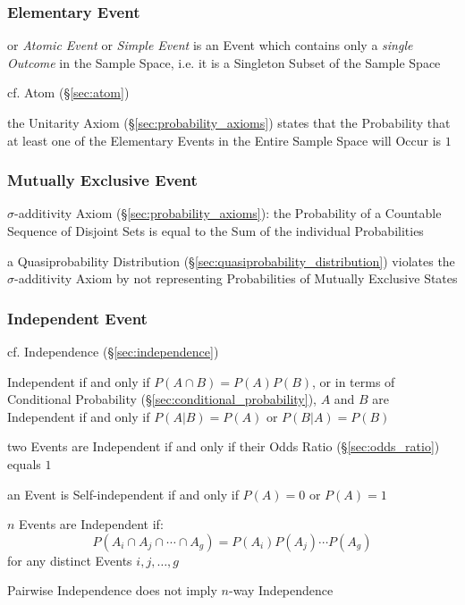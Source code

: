 \subsubsection{Elementary Event}\label{sec:elementary_event}

or \emph{Atomic Event} or \emph{Simple Event} is an Event which contains only a
\emph{single Outcome} in the Sample Space, i.e. it is a Singleton Subset of the
Sample Space

cf. Atom (\S\ref{sec:atom})

the Unitarity Axiom (\S\ref{sec:probability_axioms}) states that the
Probability that at least one of the Elementary Events in the Entire Sample
Space will Occur is $1$



\subsubsection{Mutually Exclusive Event}\label{sec:mutually_exclusive}

$\sigma$-additivity Axiom (\S\ref{sec:probability_axioms}): the Probability of
a Countable Sequence of Disjoint Sets is equal to the Sum of the individual
Probabilities

a Quasiprobability Distribution (\S\ref{sec:quasiprobability_distribution})
violates the $\sigma$-additivity Axiom by not representing Probabilities of
Mutually Exclusive States



\subsubsection{Independent Event}\label{sec:independent_event}

\fist cf. Independence (\S\ref{sec:independence})

Independent if and only if $P(A \cap B) = P(A) P(B)$, or in terms of Conditional
Probability (\S\ref{sec:conditional_probability}), $A$ and $B$ are Independent
if and only if $P(A|B) = P(A)$ or $P(B|A) = P(B)$

\fist two Events are Independent if and only if their Odds Ratio
(\S\ref{sec:odds_ratio}) equals $1$

an Event is Self-independent if and only if $P(A) = 0$ or $P(A) = 1$

$n$ Events are Independent if:
\[
  P(A_i \cap A_j \cap \cdots \cap A_g) = P(A_i)P(A_j) \cdots P(A_g)
\]
for any distinct Events $i,j,\ldots,g$

Pairwise Independence does not imply $n$-way Independence

